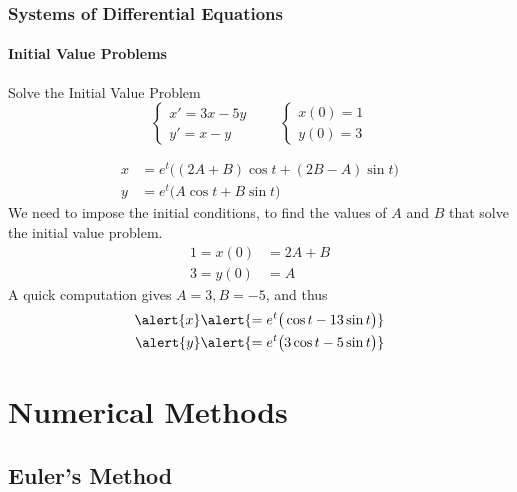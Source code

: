 \documentclass[9pt,xcolor=x11names,compress]{beamer}
\begin{document}
\begin{frame}\frametitle{Systems of Differential Equations}
\framesubtitle{Initial Value Problems}
\begin{block}
	{Solve the Initial Value Problem}
	\begin{equation*}
	\begin{cases}
		x'=3x-5y\\ y'=x-y
	\end{cases}\qquad
	\begin{cases}
		x(0)=1\\y(0)=3
	\end{cases}
	\end{equation*}
\end{block}
\begin{align*}
	x&=e^t\big( (2A+B)\cos t+(2B-A)\sin t \big) \\
	y&=e^t\big( A\cos t + B\sin t \big)
\end{align*}
We need to impose the initial conditions, to find the values of $A$ and $B$ that solve the initial value problem.
\begin{align*}
	1=x(0)&=2A+B\\
	3=y(0)&=A	
\end{align*}
\pause A quick computation gives $A=3, B=-5$, and thus
\begin{align*}
	\alert{x}&\alert{=e^t \big( \cos t-13 \sin t \big)}	 \\
	\alert{y}&\alert{=e^t \big( 3\cos t -5\sin t\big)}
\end{align*}
\end{frame}

\section{Numerical Methods}
\subsection{Euler's Method}
\end{document}
